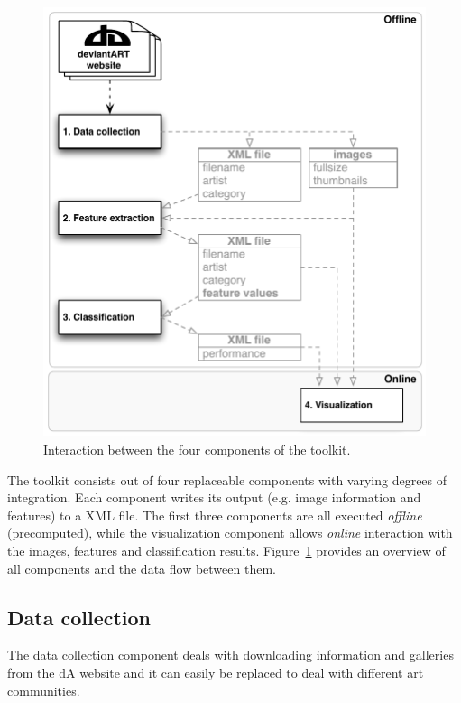 \begin{figure}[htb]
  \centering
  \includegraphics[width=1\linewidth]{img/components.pdf}
  \caption{Interaction between the four components of the toolkit.}
  \label{fig:components}
\end{figure}

The toolkit consists out of four replaceable components with varying degrees of integration.
Each component writes its output (e.g. image information and features) to a XML file.
The first three components are all executed \textit{offline} (precomputed), while the visualization component allows \textit{online} interaction with the images, features and classification results.
Figure~\ref{fig:components} provides an overview of all components and the data flow between them.

\subsection{Data collection}
The data collection component deals with downloading information and galleries from the dA website and it can easily be replaced to deal with different art communities.


